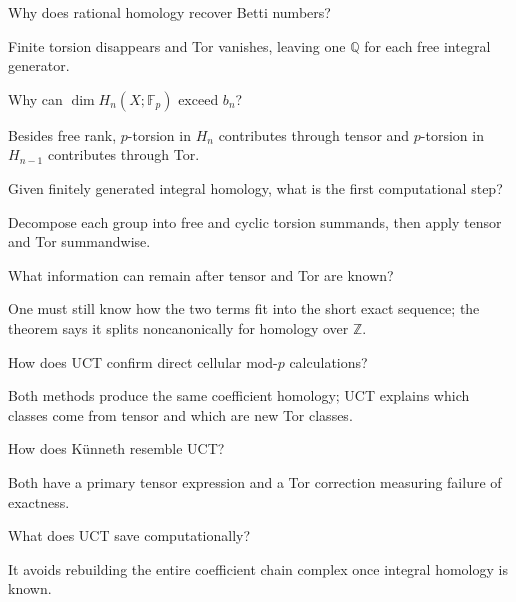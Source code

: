 \begin{problem}[Betti]\label{prob:viii26-16}
Why does rational homology recover Betti numbers?
\end{problem}
\begin{solution}
Finite torsion disappears and Tor vanishes, leaving one \(\mathbb Q\) for each free integral generator.
\end{solution}

\begin{problem}\label{prob:viii26-17}
Why can \(\dim H_n(X;\mathbb F_p)\) exceed \(b_n\)?
\end{problem}
\begin{solution}
Besides free rank, \(p\)-torsion in \(H_n\) contributes through tensor and \(p\)-torsion in \(H_{n-1}\) contributes through Tor.
\end{solution}

\begin{problem}\label{prob:viii26-18}
Given finitely generated integral homology, what is the first computational step?
\end{problem}
\begin{solution}
Decompose each group into free and cyclic torsion summands, then apply tensor and Tor summandwise.
\end{solution}

\begin{problem}\label{prob:viii26-19}
What information can remain after tensor and Tor are known?
\end{problem}
\begin{solution}
One must still know how the two terms fit into the short exact sequence; the theorem says it splits noncanonically for homology over \(\mathbb Z\).
\end{solution}

\begin{problem}\label{prob:viii26-20}
How does UCT confirm direct cellular mod-\(p\) calculations?
\end{problem}
\begin{solution}
Both methods produce the same coefficient homology; UCT explains which classes come from tensor and which are new Tor classes.
\end{solution}

\begin{problem}[Bridge]\label{prob:viii26-21}
How does Künneth resemble UCT?
\end{problem}
\begin{solution}
Both have a primary tensor expression and a Tor correction measuring failure of exactness.
\end{solution}

\begin{problem}\label{prob:viii26-22}
What does UCT save computationally?
\end{problem}
\begin{solution}
It avoids rebuilding the entire coefficient chain complex once integral homology is known.
\end{solution}
